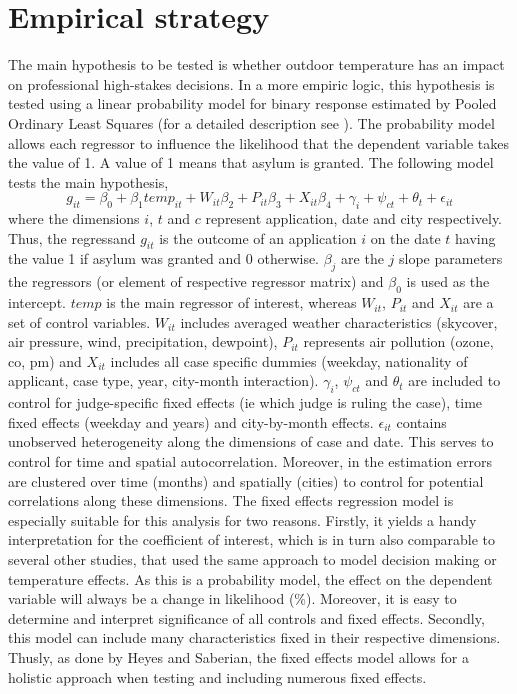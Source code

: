 \documentclass[11pt]{article}
\begin{document}
	\section{Empirical strategy}
	The main hypothesis to be tested is whether outdoor temperature has an impact on professional high-stakes decisions. In a more empiric logic, this hypothesis is tested using a linear probability model for binary response estimated by Pooled Ordinary Least Squares (for a detailed description see \cite{wooldridge2010econometric}). The probability model allows each regressor to influence the likelihood that the dependent variable takes the value of 1. A value of 1 means that asylum is granted. The following model tests the main hypothesis, 
	\newline
	\begin{equation}
		g_{ it } = \beta_{0} + \beta_{1 }temp_{it} + W_{it}\beta_{2} + P_{it}\beta_{3} + X_{it}\beta_{4} + \gamma_{i} + \psi_{ct} + \theta_{t} + \epsilon_{it}
	\end{equation}
	where the dimensions \(i\), \(t\) and \(c\) represent application, date and city respectively. Thus, the regressand \(g_{ it }\) is the outcome of an application \(i\) on the date \(t\) having the value 1 if asylum was granted and 0 otherwise. \(\beta_{j}\) are the \(j\) slope parameters the regressors (or element of respective regressor matrix) and \(\beta_{0}\) is used as the intercept. \(temp\) is the main regressor of interest, whereas \(W_{it}\), \(P_{it}\) and \(X_{it}\) are a set of control variables. \(W_{it}\) includes averaged weather characteristics (skycover, air pressure, wind, precipitation, dewpoint), \(P_{it}\) represents air pollution (ozone, co, pm) and \(X_{it}\) includes all case specific dummies (weekday, nationality of applicant, case type, year, city-month interaction). \(\gamma_{i}\), \(\psi_{ct}\) and \(\theta_{t}\) are included to control for judge-specific fixed effects (ie which judge is ruling the case), time fixed effects (weekday and years) and city-by-month effects. \(\epsilon_{it}\) contains unobserved heterogeneity along the dimensions of case and date. This serves to control for time and spatial autocorrelation. Moreover, in the estimation errors are clustered over time (months) and spatially (cities) to control for potential correlations along these dimensions.
	\newline The fixed effects regression model is especially suitable for this analysis for two reasons. Firstly, it yields a handy interpretation for the coefficient of interest, which is in turn also comparable to several other studies, that used the same approach to model decision making or temperature effects. As this is a probability model, the effect on the dependent variable will always be a change in likelihood (\%). Moreover, it is easy to determine and interpret significance of all controls and fixed effects. Secondly, this model can include many characteristics fixed in their respective dimensions. Thusly, as done by Heyes and Saberian, the fixed effects model allows for a holistic approach when testing and including numerous fixed effects.
\end{document}
